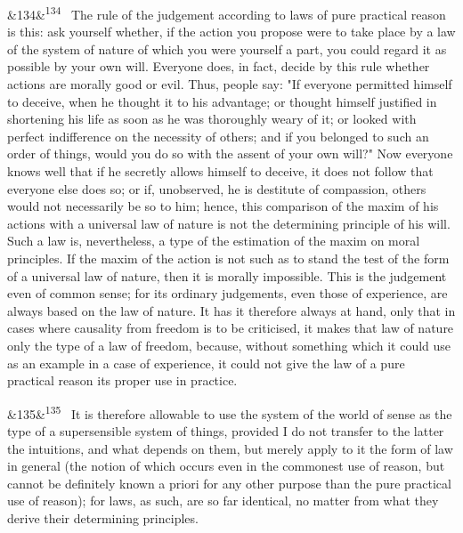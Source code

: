 \documentclass[12pt]{article}
\newcommand{\para}[1][]{\par\noindent\ifx&#1&\else\textsuperscript{\footnotesize #1}~\fi}
\begin{document}
\para[134] The rule of the judgement according to laws of pure practical reason is this: ask yourself whether, if the action you propose were to take place by a law of the system of nature of which you were yourself a part, you could regard it as possible by your own will. Everyone does, in fact, decide by this rule whether actions are morally good or evil. Thus, people say: "If everyone permitted himself to deceive, when he thought it to his advantage; or thought himself justified in shortening his life as soon as he was thoroughly weary of it; or looked with perfect indifference on the necessity of others; and if you belonged to such an order of things, would you do so with the assent of your own will?" Now everyone knows well that if he secretly allows himself to deceive, it does not follow that everyone else does so; or if, unobserved, he is destitute of compassion, others would not necessarily be so to him; hence, this comparison of the maxim of his actions with a universal law of nature is not the determining principle of his will. Such a law is, nevertheless, a type of the estimation of the maxim on moral principles. If the maxim of the action is not such as to stand the test of the form of a universal law of nature, then it is morally impossible. This is the judgement even of common sense; for its ordinary judgements, even those of experience, are always based on the law of nature. It has it therefore always at hand, only that in cases where causality from freedom is to be criticised, it makes that law of nature only the type of a law of freedom, because, without something which it could use as an example in a case of experience, it could not give the law of a pure practical reason its proper use in practice.

\para[135] It is therefore allowable to use the system of the world of sense as the type of a supersensible system of things, provided I do not transfer to the latter the intuitions, and what depends on them, but merely apply to it the form of law in general (the notion of which occurs even in the commonest use of reason, but cannot be definitely known a priori for any other purpose than the pure practical use of reason); for laws, as such, are so far identical, no matter from what they derive their determining principles.
\end{document}
